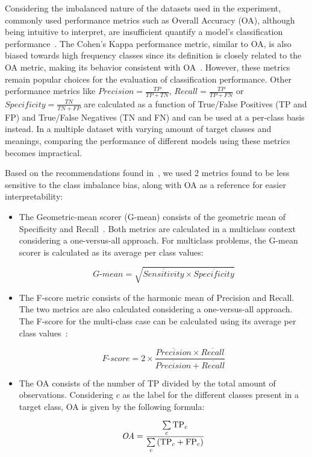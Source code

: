 \documentclass[parskip=full]{scrartcl}
\begin{document}
Considering the imbalanced nature of the datasets used in the experiment,
commonly used performance metrics such as Overall Accuracy (OA), although
being intuitive to interpret, are insufficient quantify a model's
classification performance~\cite{Jeni2013}. The Cohen's Kappa performance
metric, similar to OA, is also biased towards high frequency classes since its
definition is closely related to the OA metric, making its behavior consistent
with OA~\cite{Fatourechi2008}. However, these metrics remain popular choices
for the evaluation of classification performance. Other performance metrics
like $Precision = \frac{TP}{TP+TN}$, $Recall = \frac{TP}{TP+FN}$ or
$Specificity = \frac{TN}{TN + FP}$ are calculated as a function of True/False
Positives (TP and FP) and True/False Negatives (TN and FN) and can be used at
a per-class basis instead. In a multiple dataset with varying amount of target
classes and meanings, comparing the performance of different models using
these metrics becomes impractical.

Based on the recommendations found in~\cite{Jeni2013, Kubat1997}, we used 2
metrics found to be less sensitive to the class imbalance bias, along with OA
as a reference for easier interpretability:

\begin{itemize}
    \item The Geometric-mean scorer (G-mean) consists of the geometric mean of
        Specificity and Recall~\cite{Kubat1997}. Both metrics are calculated
        in a multiclass context considering a one-versus-all approach. For
        multiclass problems, the G-mean scorer is calculated as its average
        per class values: 
        
        \begin{equation*}
            \textit{G-mean} = \sqrt{\overline{Sensitivity} \times
            \overline{Specificity}}
        \end{equation*}

    \item The F-score metric consists of the harmonic mean of Precision and
        Recall. The two metrics are also calculated considering a
        one-versus-all approach. The F-score for the multi-class case
        can be calculated using its average per class values~\cite{Jeni2013}:

        \begin{equation*}
            \textit{F-score}=2\times\frac{\overline{Precision} \times
            \overline{Recall}}{\overline{Precision} + \overline{Recall}}
        \end{equation*}

    \item The OA consists of the number of TP divided by the total amount of
        observations. Considering $c$ as the label for the different classes
        present in a target class, OA is given by the following formula:

        \begin{equation*}
            \textit{OA} = \frac{\sum\limits_{c}{\text{TP}_{c}}}{%
		    	      \sum\limits_{c}{(\text{TP}_{c}+\text{FP}_{c})}}
        \end{equation*}
\end{itemize}
\end{document}
